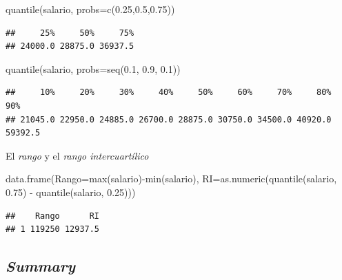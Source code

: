 \documentclass[
]{book}
\newenvironment{Shaded}{\begin{snugshade}}{\end{snugshade}}
\newcommand{\AttributeTok}[1]{\textcolor[rgb]{0.77,0.63,0.00}{#1}}
\newcommand{\FloatTok}[1]{\textcolor[rgb]{0.00,0.00,0.81}{#1}}
\newcommand{\FunctionTok}[1]{\textcolor[rgb]{0.00,0.00,0.00}{#1}}
\newcommand{\NormalTok}[1]{#1}
\newcommand{\SpecialCharTok}[1]{\textcolor[rgb]{0.00,0.00,0.00}{#1}}
\theoremstyle{break}
\theoremstyle{nonumberplain}
\begin{document}
\begin{Shaded}
\begin{Highlighting}[]
\FunctionTok{quantile}\NormalTok{(salario, }\AttributeTok{probs=}\FunctionTok{c}\NormalTok{(}\FloatTok{0.25}\NormalTok{,}\FloatTok{0.5}\NormalTok{,}\FloatTok{0.75}\NormalTok{))}
\end{Highlighting}
\end{Shaded}

\begin{verbatim}
##     25%     50%     75% 
## 24000.0 28875.0 36937.5
\end{verbatim}

\begin{Shaded}
\begin{Highlighting}[]
\FunctionTok{quantile}\NormalTok{(salario, }\AttributeTok{probs=}\FunctionTok{seq}\NormalTok{(}\FloatTok{0.1}\NormalTok{, }\FloatTok{0.9}\NormalTok{, }\FloatTok{0.1}\NormalTok{))}
\end{Highlighting}
\end{Shaded}

\begin{verbatim}
##     10%     20%     30%     40%     50%     60%     70%     80%     90% 
## 21045.0 22950.0 24885.0 26700.0 28875.0 30750.0 34500.0 40920.0 59392.5
\end{verbatim}

El \emph{rango} y el \emph{rango intercuartílico}

\begin{Shaded}
\begin{Highlighting}[]
\FunctionTok{data.frame}\NormalTok{(}\AttributeTok{Rango=}\FunctionTok{max}\NormalTok{(salario)}\SpecialCharTok{{-}}\FunctionTok{min}\NormalTok{(salario),}
           \AttributeTok{RI=}\FunctionTok{as.numeric}\NormalTok{(}\FunctionTok{quantile}\NormalTok{(salario, }\FloatTok{0.75}\NormalTok{) }\SpecialCharTok{{-}} \FunctionTok{quantile}\NormalTok{(salario, }\FloatTok{0.25}\NormalTok{)))}
\end{Highlighting}
\end{Shaded}

\begin{verbatim}
##    Rango      RI
## 1 119250 12937.5
\end{verbatim}

\hypertarget{summary}{%
\subsection{\texorpdfstring{\emph{Summary}}{Summary}}\label{summary}}
\end{document}
